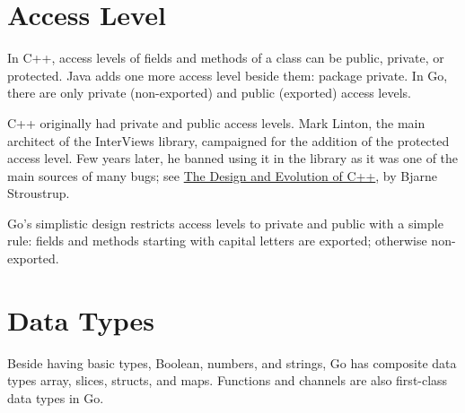 \documentclass[11pt]{article}
\begin{document}
\section*{Access Level}
\label{sec:orgheadline14}
In C++, access levels of fields and methods of a class can be public, private, or protected. Java adds one more access level beside them: package private. In Go, there are only private (non-exported) and public (exported) access levels.

C++ originally had private and public access levels. Mark Linton, the main architect of the InterViews library, campaigned for the addition of the protected access level. Few years later, he banned using it in the library as it was one of the main sources of many bugs; see \href{http://www.stroustrup.com/dne.html}{The Design and Evolution of C++}, by Bjarne Stroustrup.

Go's simplistic design restricts access levels to private and public with a simple rule: fields and methods starting with capital letters are exported; otherwise non-exported.

\section*{Data Types}
\label{sec:orgheadline17}
Beside having basic types, Boolean, numbers, and strings, Go has composite data types array, slices, structs, and maps. Functions and channels are also first-class data types in Go.
\end{document}

